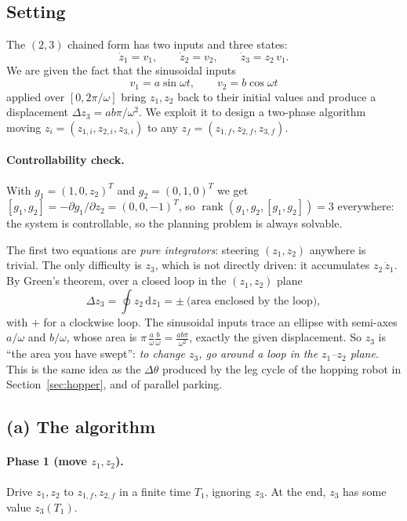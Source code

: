 \documentclass[11pt,a4paper]{article}
\def\boldsymbol#1{#1}%
\DeclareMathOperator{\rank}{rank}
\newcommand{\g}{\boldsymbol{g}}
\newcommand{\z}{\boldsymbol{z}}
\theoremstyle{definition}
\theoremstyle{plain}
\theoremstyle{remark}
\begin{document}
\subsection{Setting}

The $(2,3)$ chained form has two inputs and three states:
\begin{equation}
  \dot z_1=v_1,\qquad \dot z_2=v_2,\qquad \dot z_3=z_2\,v_1 .
  \label{eq:chain}
\end{equation}
We are given the fact that the sinusoidal inputs
\[
  v_1=a\sin\omega t,\qquad v_2=b\cos\omega t
\]
applied over $[0,2\pi/\omega]$ bring $z_1,z_2$ back to their initial values and produce a displacement $\Delta z_3=ab\pi/\omega^2$. We exploit it to design a two-phase algorithm moving $\z_i=(z_{1,i},z_{2,i},z_{3,i})$ to any $\z_f=(z_{1,f},z_{2,f},z_{3,f})$.

\paragraph{Controllability check.} With $\g_1=(1,0,z_2)^T$ and $\g_2=(0,1,0)^T$ we get $[\g_1,\g_2]=-\partial\g_1/\partial z_2=(0,0,-1)^T$, so $\rank(\g_1,\g_2,[\g_1,\g_2])=3$ everywhere: the system is controllable, so the planning problem is always solvable.

\begin{intuition}
The first two equations are \emph{pure integrators}: steering $(z_1,z_2)$ anywhere is trivial. The only difficulty is $z_3$, which is not directly driven: it accumulates $z_2\,\dot z_1$. By Green's theorem, over a closed loop in the $(z_1,z_2)$ plane
\[
  \Delta z_3=\oint z_2\,\mathrm dz_1=\pm\ \text{(area enclosed by the loop)},
\]
with $+$ for a clockwise loop. The sinusoidal inputs trace an ellipse with semi-axes $a/\omega$ and $b/\omega$, whose area is $\pi\,\frac{a}{\omega}\frac{b}{\omega}=\frac{ab\pi}{\omega^2}$, exactly the given displacement. So $z_3$ is ``the area you have swept'': \emph{to change $z_3$, go around a loop in the $z_1$--$z_2$ plane}. This is the same idea as the $\Delta\theta$ produced by the leg cycle of the hopping robot in Section~\ref{sec:hopper}, and of parallel parking.
\end{intuition}

\subsection{(a) The algorithm}

\paragraph{Phase 1 (move $z_1,z_2$).} Drive $z_1,z_2$ to $z_{1,f},z_{2,f}$ in a finite time $T_1$, ignoring $z_3$. At the end, $z_3$ has some value $z_3(T_1)$.
\end{document}
